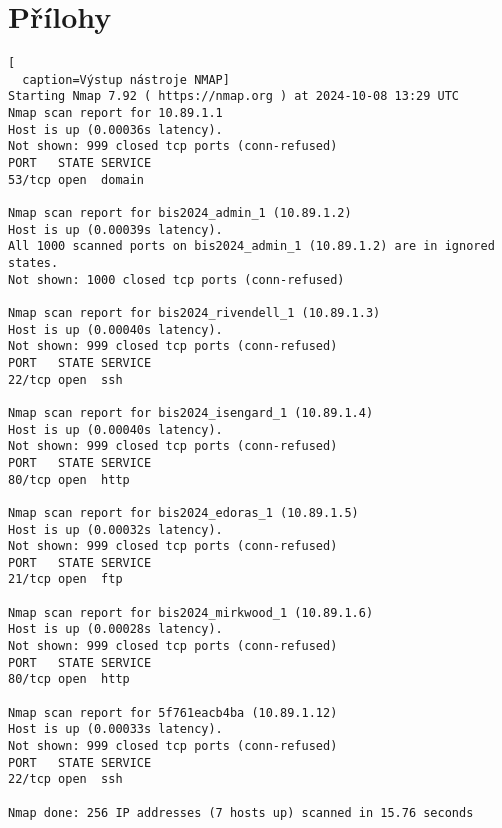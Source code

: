 \documentclass[a4paper, 11pt]{article}
\begin{document}
\section*{Přílohy}
\begin{lstlisting}[
  caption=Výstup nástroje NMAP]
Starting Nmap 7.92 ( https://nmap.org ) at 2024-10-08 13:29 UTC
Nmap scan report for 10.89.1.1
Host is up (0.00036s latency).
Not shown: 999 closed tcp ports (conn-refused)
PORT   STATE SERVICE
53/tcp open  domain

Nmap scan report for bis2024_admin_1 (10.89.1.2)
Host is up (0.00039s latency).
All 1000 scanned ports on bis2024_admin_1 (10.89.1.2) are in ignored states.
Not shown: 1000 closed tcp ports (conn-refused)

Nmap scan report for bis2024_rivendell_1 (10.89.1.3)
Host is up (0.00040s latency).
Not shown: 999 closed tcp ports (conn-refused)
PORT   STATE SERVICE
22/tcp open  ssh

Nmap scan report for bis2024_isengard_1 (10.89.1.4)
Host is up (0.00040s latency).
Not shown: 999 closed tcp ports (conn-refused)
PORT   STATE SERVICE
80/tcp open  http

Nmap scan report for bis2024_edoras_1 (10.89.1.5)
Host is up (0.00032s latency).
Not shown: 999 closed tcp ports (conn-refused)
PORT   STATE SERVICE
21/tcp open  ftp

Nmap scan report for bis2024_mirkwood_1 (10.89.1.6)
Host is up (0.00028s latency).
Not shown: 999 closed tcp ports (conn-refused)
PORT   STATE SERVICE
80/tcp open  http

Nmap scan report for 5f761eacb4ba (10.89.1.12)
Host is up (0.00033s latency).
Not shown: 999 closed tcp ports (conn-refused)
PORT   STATE SERVICE
22/tcp open  ssh

Nmap done: 256 IP addresses (7 hosts up) scanned in 15.76 seconds
\end{lstlisting}
\end{document}
